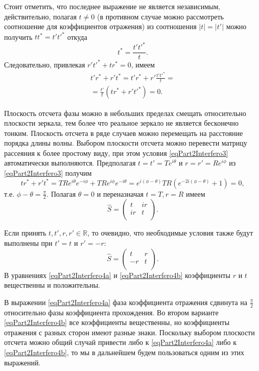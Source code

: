 Стоит отметить, что последнее выражение не является независимым,
действительно, полагая $t \ne 0$ (в противном случае можно рассмотреть
соотношение для коэффициентов отражения)
из соотношения $\left|t\right| = \left|t'\right|$ можно получить
\(
t t^\ast = t' t'^\ast
\)
откуда
\[
t^\ast = \frac{t' t'^\ast}{t}.
\]
Следовательно, привлекая $r' t'^\ast + t r^\ast = 0$, имеем
\begin{eqnarray}
  t' r^\ast + r' t^\ast =
  t' r^\ast + r' \frac{t' t'^\ast}{t} =
  \nonumber \\
  = \frac{t'}{t}\left(t r^\ast + r't'^\ast\right) = 0.
  \nonumber
\end{eqnarray}

Плоскость отсчета фазы можно в небольших пределах смещать относительно
плоскости зеркала, тем более что реальное зеркало не является
бесконечно тонким. Плоскость отсчета в ряде случаев можно перемещать
на расстояние порядка длины волны. Выбором плоскости отсчета можно
перевести матрицу рассеяния к более простому виду, при этом условия 
\eqref{eqPart2Interfero3} автоматически выполняются.
Предполагая $t = t' = T e^{i \theta}$ и $r = r' = R e^{i \phi}$ из
\eqref{eqPart2Interfero3} получим
\[
t r^\ast + r' t^\ast = TR e^{ i \theta} e^{- i \phi} + TR e^{ i \phi}
e^{- i \theta} =
e^{i (\phi-\theta)} TR \left(e^{-2 i (\phi-\theta)} + 1\right) = 0,
\]
т.е. $\phi - \theta = \frac{\pi}{2}$. Полагая $\theta = 0$ и
переназначая $t = T, r = R$ имеем
\begin{equation}
\hat{S} = \left(
\begin{array}{cc}
t & i r \\
i r & t \\
\end{array}
\right).
\label{eqPart2Interfero4a}
\end{equation}

Если принять $t,t',r,r' \in \mathbb{R}$, то очевидно, что необходимые
условия также будут выполнены при $t' = t$ и $r' = -r$:
\begin{equation}
\hat{S} = \left(
\begin{array}{cc}
t & r \\
-r & t \\
\end{array}
\right).
\label{eqPart2Interfero4b}
\end{equation}
В уравнениях \eqref{eqPart2Interfero4a} и \eqref{eqPart2Interfero4b}
коэффициенты $r$ и $t$ вещественны и положительны.

В выражении \eqref{eqPart2Interfero4a} фаза коэффициента отражения
сдвинута на $\frac{\pi}{2}$ относительно фазы коэффициента
прохождения. Во втором варианте \eqref{eqPart2Interfero4b} все
коэффициенты вещественны, но коэффициенты отражения с разных сторон
имеют разные знаки. Поскольку выбором плоскости отсчета можно общий
случай привести либо к  \eqref{eqPart2Interfero4a} либо к
\eqref{eqPart2Interfero4b}, то мы в дальнейшем будем пользоваться
одним из этих выражений.

